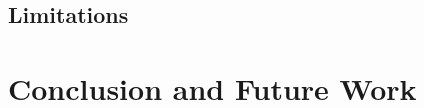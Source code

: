 \documentclass[runningheads]{llncs}
\begin{document}
\subsection{Limitations}
\label{sec:disc_limitations}


\section{Conclusion and Future Work}
\label{sec:conclusion}

\end{document}
